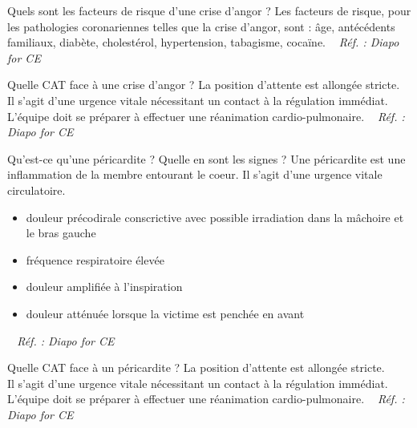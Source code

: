 \documentclass[grid,avery5371,landscape]{flashcards}
\makeatletter
\newcounter{nocarte}
\newcommand{\categ}[1]{%
  \def\@categ{#1}%
  \setcounter{nocarte}{0}%
}
\newcommand{\source}[1]{%
  \medskip
  \itshape%
   ~ \hfill Réf. : #1}
\makeatother
\begin{document}
\color[HTML]{01DF01}
\categ{CE-CP-REG}
\begin{flashcard}[bilan]{
 Quels sont les facteurs de risque d'une crise d'angor ?   }
  Les facteurs de risque, pour les pathologies coronariennes telles que la crise d'angor, sont : âge, antécédents familiaux, diabète, cholestérol, hypertension, tabagisme, cocaïne.
  \source{Diapo for CE }
\end{flashcard}


\color[HTML]{01DF01}
\categ{CE-CP-REG}
\begin{flashcard}[CAT]{
 Quelle CAT face à une crise d'angor ?   }
  La position d'attente est allongée stricte. \\
   Il s'agit d'une urgence vitale nécessitant un contact à la régulation immédiat.\\
   L'équipe doit se préparer à effectuer une réanimation cardio-pulmonaire.
  \source{Diapo for CE }
\end{flashcard}


\color[HTML]{01DF01}
\categ{CE-CP-REG}
\begin{flashcard}[bilan]{
 Qu'est-ce qu'une péricardite ? Quelle en sont les signes ?   }
  Une péricardite est une inflammation de la membre entourant le coeur. Il s'agit d'une urgence vitale circulatoire.
   \begin{itemize}
       \item douleur précodirale conscrictive avec possible irradiation dans la mâchoire et le bras gauche
       \item fréquence respiratoire élevée
       \item douleur amplifiée à l'inspiration
       \item douleur atténuée lorsque la victime est penchée en avant
   \end{itemize}
  \source{Diapo for CE }
\end{flashcard}


\color[HTML]{01DF01}
\categ{CE-CP-REG}
\begin{flashcard}[CAT]{
 Quelle CAT face à un péricardite ?   }
  La position d'attente est allongée stricte. \\
   Il s'agit d'une urgence vitale nécessitant un contact à la régulation immédiat.\\
   L'équipe doit se préparer à effectuer une réanimation cardio-pulmonaire.
  \source{Diapo for CE }
\end{flashcard}
\end{document}
